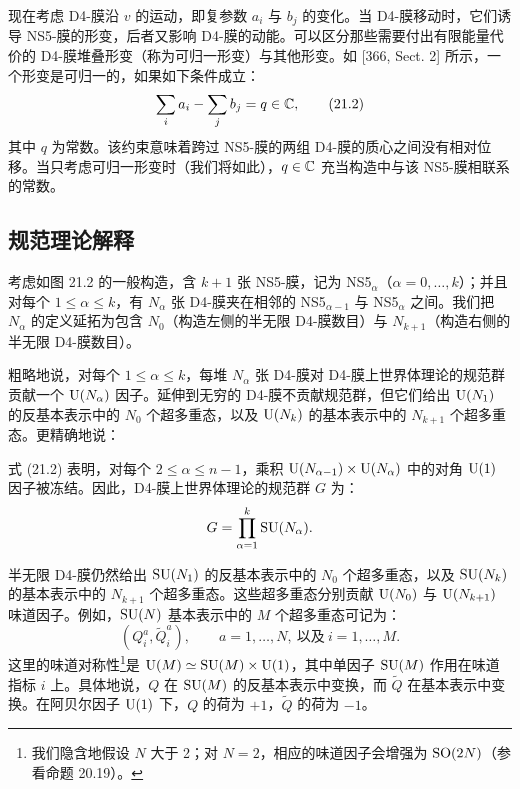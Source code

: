 现在考虑 D4-膜沿 $v$ 的运动，即复参数 $a_i$ 与 $b_j$ 的变化。当 D4-膜移动时，它们诱导 NS5-膜的形变，后者又影响 D4-膜的动能。可以区分那些需要付出有限能量代价的 D4-膜堆叠形变（称为可归一形变）与其他形变。如 [366, Sect. 2] 所示，一个形变是可归一的，如果如下条件成立：
\begin{equation}
\sum_i a_i-\sum_j b_j=q\in\mathbb{C},
\tag{21.2}
\end{equation}
其中 $q$ 为常数。该约束意味着跨过 NS5-膜的两组 D4-膜的质心之间没有相对位移。当只考虑可归一形变时（我们将如此），$q\in\mathbb{C}$ 充当构造中与该 NS5-膜相联系的常数。

\subsection{规范理论解释}

考虑如图 21.2 的一般构造，含 $k+1$ 张 NS5-膜，记为 NS5$_\alpha$（$\alpha=0,\dots,k$）；并且对每个 $1\le\alpha\le k$，有 $N_\alpha$ 张 D4-膜夹在相邻的 NS5$_{\alpha-1}$ 与 NS5$_\alpha$ 之间。我们把 $N_\alpha$ 的定义延拓为包含 $N_0$（构造左侧的半无限 D4-膜数目）与 $N_{k+1}$（构造右侧的半无限 D4-膜数目）。

粗略地说，对每个 $1\le\alpha\le k$，每堆 $N_\alpha$ 张 D4-膜对 D4-膜上世界体理论的规范群贡献一个 $\operatorname{U}(N_\alpha)$ 因子。延伸到无穷的 D4-膜不贡献规范群，但它们给出 $\operatorname{U}(N_1)$ 的反基本表示中的 $N_0$ 个超多重态，以及 $\operatorname{U}(N_k)$ 的基本表示中的 $N_{k+1}$ 个超多重态。更精确地说：

\begin{proposition}[21.3] 式 (21.2) 表明，对每个 $2\le\alpha\le n-1$，乘积 $\operatorname{U}(N_{\alpha-1})\times\operatorname{U}(N_\alpha)$ 中的对角 $\operatorname{U}(1)$ 因子被冻结。因此，D4-膜上世界体理论的规范群 $G$ 为：
\[
G=\prod_{\alpha=1}^{k}\operatorname{SU}(N_\alpha).
\]
\end{proposition}


半无限 D4-膜仍然给出 $\operatorname{SU}(N_1)$ 的反基本表示中的 $N_0$ 个超多重态，以及 $\operatorname{SU}(N_k)$ 的基本表示中的 $N_{k+1}$ 个超多重态。这些超多重态分别贡献 $\operatorname{U}(N_0)$ 与 $\operatorname{U}(N_{k+1})$ 味道因子。例如，$\operatorname{SU}(N)$ 基本表示中的 $M$ 个超多重态可记为：
\[
(Q^a_i,\tilde Q^a_i),\qquad a=1,\dots,N,\ \text{以及}\ i=1,\dots,M.
\]
这里的味道对称性\footnote{我们隐含地假设 $N$ 大于 2；对 $N=2$，相应的味道因子会增强为 $\operatorname{SO}(2N)$（参看命题 20.19）。}是 $\operatorname{U}(M)\simeq\operatorname{SU}(M)\times\operatorname{U}(1)$，其中单因子 $\operatorname{SU}(M)$ 作用在味道指标 $i$ 上。具体地说，$Q$ 在 $\operatorname{SU}(M)$ 的反基本表示中变换，而 $\tilde Q$ 在基本表示中变换。在阿贝尔因子 $\operatorname{U}(1)$ 下，$Q$ 的荷为 $+1$，$\tilde Q$ 的荷为 $-1$。

